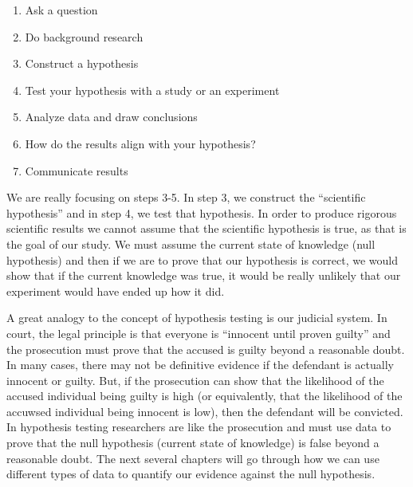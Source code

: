 \documentclass[
]{book}
\providecommand{\tightlist}{%
  \setlength{\itemsep}{0pt}\setlength{\parskip}{0pt}}
\theoremstyle{definition}
\theoremstyle{definition}
\theoremstyle{definition}
\theoremstyle{remark}
\begin{document}
\begin{enumerate}
\def\labelenumi{\arabic{enumi})}
\tightlist
\item
  Ask a question
\item
  Do background research
\item
  Construct a hypothesis
\item
  Test your hypothesis with a study or an experiment
\item
  Analyze data and draw conclusions
\item
  How do the results align with your hypothesis?
\item
  Communicate results
\end{enumerate}

We are really focusing on steps 3-5. In step 3, we construct the ``scientific hypothesis'' and in step 4, we test that hypothesis. In order to produce rigorous scientific results we cannot assume that the scientific hypothesis is true, as that is the goal of our study. We must assume the current state of knowledge (null hypothesis) and then if we are to prove that our hypothesis is correct, we would show that if the current knowledge was true, it would be really unlikely that our experiment would have ended up how it did.

A great analogy to the concept of hypothesis testing is our judicial system. In court, the legal principle is that everyone is ``innocent until proven guilty'' and the prosecution must prove that the accused is guilty beyond a reasonable doubt. In many cases, there may not be definitive evidence if the defendant is actually innocent or guilty. But, if the prosecution can show that the likelihood of the accused individual being guilty is high (or equivalently, that the likelihood of the accuwsed individual being innocent is low), then the defendant will be convicted. In hypothesis testing researchers are like the prosecution and must use data to prove that the null hypothesis (current state of knowledge) is false beyond a reasonable doubt. The next several chapters will go through how we can use different types of data to quantify our evidence against the null hypothesis.
\end{document}

